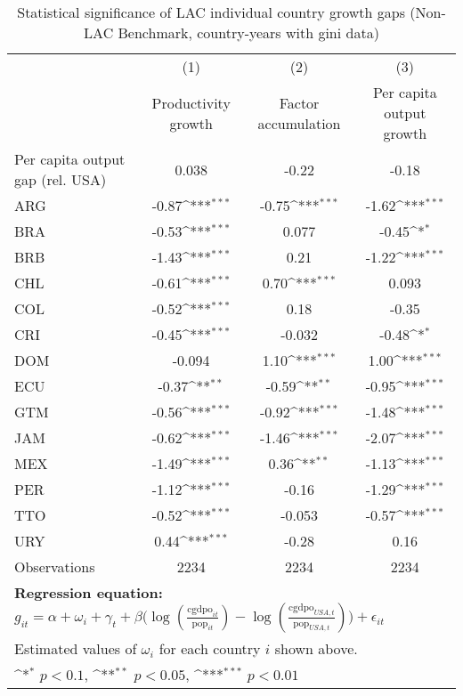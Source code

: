 \begin{table}[htbp]\centering
\def\sym#1{\ifmmode^{#1}\else\(^{#1}\)\fi}
\caption{Statistical significance of LAC individual country growth gaps (Non-LAC Benchmark, country-years with gini data)}
\begin{tabular}{l*{3}{c}}
\toprule
                &\multicolumn{1}{c}{(1)}&\multicolumn{1}{c}{(2)}&\multicolumn{1}{c}{(3)}\\
                &\multicolumn{1}{c}{Productivity growth}&\multicolumn{1}{c}{Factor accumulation}&\multicolumn{1}{c}{Per capita output growth}\\
\midrule
Per capita output gap (rel. USA)&    0.038         &    -0.22         &    -0.18         \\
ARG             &    -0.87\sym{***}&    -0.75\sym{***}&    -1.62\sym{***}\\
BRA             &    -0.53\sym{***}&    0.077         &    -0.45\sym{*}  \\
BRB             &    -1.43\sym{***}&     0.21         &    -1.22\sym{***}\\
CHL             &    -0.61\sym{***}&     0.70\sym{***}&    0.093         \\
COL             &    -0.52\sym{***}&     0.18         &    -0.35         \\
CRI             &    -0.45\sym{***}&   -0.032         &    -0.48\sym{*}  \\
DOM             &   -0.094         &     1.10\sym{***}&     1.00\sym{***}\\
ECU             &    -0.37\sym{**} &    -0.59\sym{**} &    -0.95\sym{***}\\
GTM             &    -0.56\sym{***}&    -0.92\sym{***}&    -1.48\sym{***}\\
JAM             &    -0.62\sym{***}&    -1.46\sym{***}&    -2.07\sym{***}\\
MEX             &    -1.49\sym{***}&     0.36\sym{**} &    -1.13\sym{***}\\
PER             &    -1.12\sym{***}&    -0.16         &    -1.29\sym{***}\\
TTO             &    -0.52\sym{***}&   -0.053         &    -0.57\sym{***}\\
URY             &     0.44\sym{***}&    -0.28         &     0.16         \\
\midrule
Observations    &     2234         &     2234         &     2234         \\
\bottomrule
\multicolumn{4}{l}{\footnotesize \textbf{Regression equation:} \(g_{it} = \alpha  + \omega_i + \gamma_t + \beta \big(\log (\frac{\textrm{cgdpo}_{it}}{\textrm{pop}_{it}} ) - \log (\frac{\textrm{cgdpo}_{USA,t}}{\textrm{pop}_{USA,t}}  ) \big) + \epsilon_{it}\)}\\
\multicolumn{4}{l}{\footnotesize Estimated values of \(\omega_i\) for each country \(i\) shown above.}\\
\multicolumn{4}{l}{\footnotesize \sym{*} \(p<0.1\), \sym{**} \(p<0.05\), \sym{***} \(p<0.01\)}\\
\end{tabular}
\end{table}

